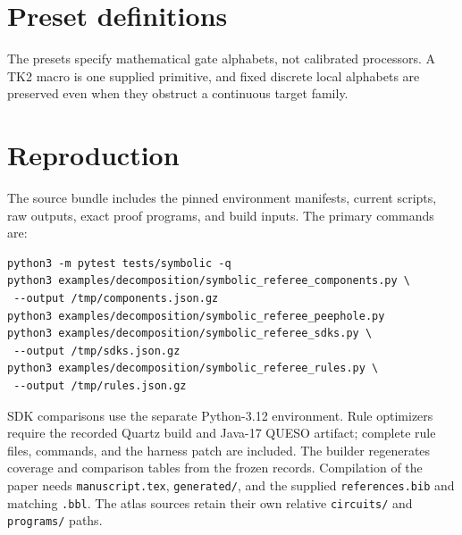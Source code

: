 \documentclass[11pt]{article}
\begin{document}
\section{Preset definitions}

The presets specify mathematical gate alphabets, not calibrated processors.
A TK2 macro is one supplied primitive, and fixed discrete local alphabets
are preserved even when they obstruct a continuous target family.

\section{Reproduction}
The source bundle includes the pinned environment manifests, current scripts,
raw outputs, exact proof programs, and build inputs. The primary commands are:
\begin{verbatim}
python3 -m pytest tests/symbolic -q
python3 examples/decomposition/symbolic_referee_components.py \
 --output /tmp/components.json.gz
python3 examples/decomposition/symbolic_referee_peephole.py
python3 examples/decomposition/symbolic_referee_sdks.py \
 --output /tmp/sdks.json.gz
python3 examples/decomposition/symbolic_referee_rules.py \
 --output /tmp/rules.json.gz
\end{verbatim}
SDK comparisons use the separate Python-3.12 environment. Rule optimizers
require the recorded Quartz build and Java-17 QUESO artifact; complete rule
files, commands, and the harness patch are included. The builder regenerates
coverage and comparison tables from the frozen records. Compilation of the
paper needs \texttt{manuscript.tex}, \texttt{generated/}, and the supplied
\texttt{references.bib} and matching \texttt{.bbl}. The atlas sources retain
their own relative \texttt{circuits/} and \texttt{programs/} paths.



\end{document}
